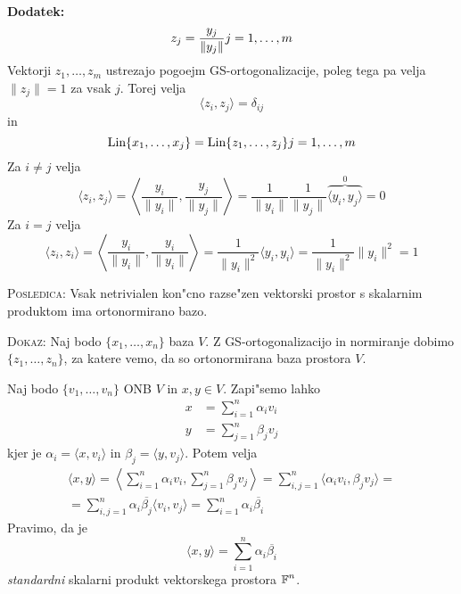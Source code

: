 \textbf{Dodatek:}
\begin{equation*}
z_j = \dfrac{y_j}{\| y_j \|} \hfill j = 1, \ldots, m
\end{equation*}
Vektorji $z_1, \ldots, z_m$ ustrezajo pogoejm GS-ortogonalizacije, poleg tega pa velja $\| z_j \| = 1$ za vsak $j$. Torej velja
\begin{equation*}
\langle z_i, z_j \rangle = \delta_{ij}
\end{equation*}
in
\begin{equation*}
\Lin \{ x_1, \ldots, x_j \} = \Lin \{ z_1, \ldots, z_j \} \hfill j = 1, \ldots, m
\end{equation*}
Za $i \neq j$ velja
\begin{equation*}
\langle z_i, z_j \rangle = \left\langle \dfrac{y_i}{\| y_i \|}, \dfrac{y_j}{\| y_j \|} \right\rangle = \dfrac{1}{\| y_i \|} \dfrac{1}{\| y_j \|} \overbrace{\langle y_i, y_j \rangle}^0 = 0
\end{equation*}
Za $i = j$ velja
\begin{equation*}
\langle z_i, z_i \rangle = \left\langle \dfrac{y_i}{\| y_i \|}, \dfrac{y_i}{\| y_i \|} \right\rangle = \dfrac{1}{\| y_i \|^2} \langle y_i, y_i \rangle = \dfrac{1}{\| y_i \|^2} \| y_i \|^2 = 1
\end{equation*}

\textsc{Posledica:} Vsak netrivialen kon"cno razse"zen vektorski prostor s skalarnim produktom ima ortonormirano bazo.

\textsc{Dokaz:} Naj bodo $\{ x_1, \ldots, x_n \}$ baza $V$. Z GS-ortogonalizacijo in normiranje dobimo $\{ z_1, \ldots, z_n \}$, za katere vemo, da so ortonormirana baza prostora $V$.

Naj bodo $\{ v_1, \ldots, v_n \}$ ONB $V$ in $x, y \in V$. Zapi"semo lahko
\begin{align*}
x &= \sum_{i = 1}^n \alpha_i v_i \\
y &= \sum_{j = 1}^n \beta_j v_j
\end{align*}
kjer je $\alpha_i = \langle x, v_i \rangle$ in $\beta_j = \langle y, v_j \rangle$. Potem velja
\begin{multline*}
\langle x, y \rangle = \left\langle \sum_{i = 1}^n \alpha_i v_i, \sum_{j =1}^n \beta_j v_j \right\rangle = \sum_{i, j = 1}^n \langle \alpha_i v_i, \beta_j v_j \rangle = \\
= \sum_{i, j = 1}^n \alpha_i \overline{\beta_j} \langle v_i, v_j \rangle = \sum_{i=1}^n \alpha_i \overline{\beta_i}
\end{multline*}
Pravimo, da je
\begin{equation*}
\langle x, y \rangle = \sum_{i=1}^n \alpha_i \overline{\beta_i}
\end{equation*}
\emph{standardni} skalarni produkt vektorskega prostora $\operatorname{\mathbb{F}}^n$.

